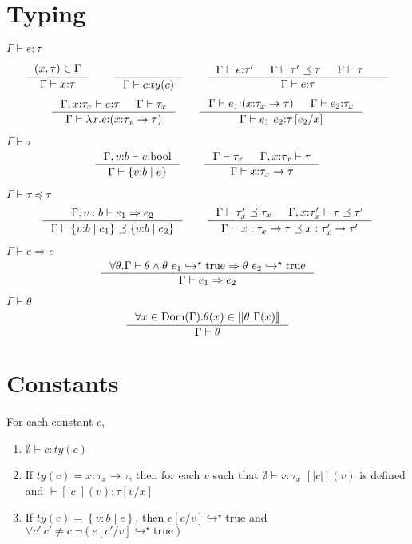 \documentclass[10pt,a4paper]{article}
\newcommand\efun[2]{\ensuremath{\lambda #1 . #2}}
\newcommand\eapp[2]{\ensuremath{#1 \ #2}}
\newcommand\etrue{\ensuremath{\text{true}}}
\newcommand\tbool{\ensuremath{\text{bool}}}
\newcommand\tref[3]{\ensuremath{\left\lbrace #1 \colon #2 \mid #3 \right\rbrace}}
\newcommand\tfun[3]{\ensuremath{#1\colon #2 \rightarrow #3}}
\newcommand\sub[2]{\ensuremath{\left[ #2 / #1 \right]}}
\newcommand\interp[1]{\ensuremath{[|#1|]}}
\newcommand\evals[2]{\ensuremath{#1 \hookrightarrow^\star #2}}
\newcommand\hastype[3]{\ensuremath{#1 \vdash #2 \colon #3}}
\newcommand\iswellformed[2]{\ensuremath{#1 \vdash #2}}
\newcommand\issubtype[3]{\ensuremath{#1 \vdash #2 \preceq #3}}
\newcommand\issubref[3]{\ensuremath{#1 \vdash #2 \Rightarrow #3}}
\begin{document}
\section*{Typing}

\hfill\mbox{\hastype{\Gamma}{e}{\tau}}


$$
\inference{
	(x,\tau) \in \Gamma
}{
	\hastype{\Gamma}{x}{\tau}
}
\qquad
\inference{
}{
	\hastype{\Gamma}{c}{ty(c)}
}
\qquad
\inference{
	\hastype{\Gamma}{e}{\tau'} &&
	\issubtype{\Gamma}{\tau'}{\tau} &&
	\iswellformed{\Gamma}{\tau} &&
}{
	\hastype{\Gamma}{e}{\tau}
}
$$
$$
\inference{
	\hastype{\Gamma, x\colon\tau_x}{e}{\tau} &&
	\iswellformed{\Gamma}{\tau_x}
}{
	\hastype{\Gamma}{\efun{x}{e}}{(\tfun{x}{\tau_x}{\tau})}
}
\qquad
\inference{
	\hastype{\Gamma}{e_1}{(\tfun{x}{\tau_{x}}{\tau})} &&
	\hastype{\Gamma}{e_2}{\tau_{x}}
}{
	\hastype{\Gamma}{\eapp{e_1}{e_2}}{\tau\sub{x}{e_2}}
}
$$


\hfill\mbox{\iswellformed{\Gamma}{\tau}}
$$
\inference{
	\hastype{\Gamma, v\colon b}{e}{\tbool}
}{
	\iswellformed{\Gamma}{\tref{v}{b}{e}}
}
\qquad
\inference{
	\iswellformed{\Gamma}{\tau_x} &&
	\iswellformed{\Gamma, x \colon \tau_x}{\tau}
}{
	\iswellformed{\Gamma}{\tfun{x}{\tau_x}{\tau}}
}
$$

\hfill\mbox{\issubtype{\Gamma}{\tau}{\tau}}
$$
\inference{
	\issubref{\Gamma, v:b}{e_1}{e_2}
}{
	\issubtype{\Gamma}{\tref{v}{b}{e_1}}{\tref{v}{b}{e_2}}
}
\qquad
\inference{
	\issubtype{\Gamma}{\tau'_x}{\tau_x} &&
	\issubtype{\Gamma, x \colon \tau'_x}{\tau}{\tau'}
}{
	\issubtype{\Gamma}{x:\tau_x \rightarrow \tau}{x:\tau'_x \rightarrow \tau'}
}
$$

\hfill\mbox{\issubref{\Gamma}{e}{e}}
$$
\inference{
	\forall \theta. \iswellformed{\Gamma}{\theta} \land
	\evals{\theta\ e_1}{\etrue} \Rightarrow \evals{\theta\ e_2}{\etrue}
}{
	\issubref{\Gamma}{e_1}{e_2}
}
$$



\hfill\mbox{\iswellformed{\Gamma}{\theta}}
$$
\inference{
	\forall x \in \text{Dom}(\Gamma). 
	\theta(x) \in \interp{\theta \ \Gamma(x)}
}{
	\iswellformed{\Gamma}{\theta}
}
$$


\section*{Constants}
For each constant $c$, 
\begin{enumerate}
\item \hastype{\emptyset}{c}{ty(c)}
\item If $ty(c) = \tfun{x}{\tau_x}{\tau}$, then for each $v$ such that
\hastype{\emptyset}{v}{\tau_x} $\interp{c}(v)$ is defined and
\hastype{}{\interp{c}(v)}{\tau\sub{x}{v}}
\item If $ty(c) = \tref{v}{b}{e}$, 
then \evals{e\sub{v}{c}}{\etrue} and $\forall c'\ c' \neq c. \lnot (\evals{e\sub{v}{c'}}{\etrue})$ 
\end{enumerate}
\end{document}
